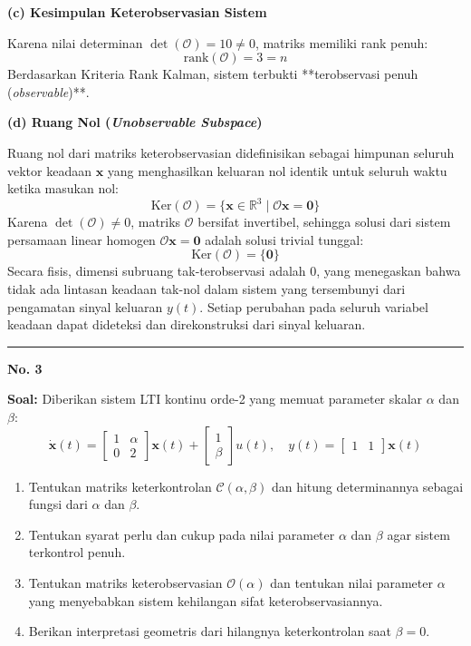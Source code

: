 \documentclass[11pt,a4paper]{article}
\begin{document}
\textbf{(c) Kesimpulan Keterobservasian Sistem}

Karena nilai determinan $\det(\mathcal{O}) = 10 \ne 0$, matriks memiliki rank penuh:
$$\text{rank}(\mathcal{O}) = 3 = n$$
Berdasarkan Kriteria Rank Kalman, sistem terbukti **terobservasi penuh (\textit{observable})**.

\textbf{(d) Ruang Nol (\textit{Unobservable Subspace})}

Ruang nol dari matriks keterobservasian didefinisikan sebagai himpunan seluruh vektor keadaan $\mathbf{x}$ yang menghasilkan keluaran nol identik untuk seluruh waktu ketika masukan nol:
$$\text{Ker}(\mathcal{O}) = \{ \mathbf{x} \in \mathbb{R}^3 \mid \mathcal{O}\mathbf{x} = \mathbf{0} \}$$
Karena $\det(\mathcal{O}) \ne 0$, matriks $\mathcal{O}$ bersifat invertibel, sehingga solusi dari sistem persamaan linear homogen $\mathcal{O}\mathbf{x} = \mathbf{0}$ adalah solusi trivial tunggal:
$$\text{Ker}(\mathcal{O}) = \{ \mathbf{0} \}$$
Secara fisis, dimensi subruang tak-terobservasi adalah 0, yang menegaskan bahwa tidak ada lintasan keadaan tak-nol dalam sistem yang tersembunyi dari pengamatan sinyal keluaran $y(t)$. Setiap perubahan pada seluruh variabel keadaan dapat dideteksi dan direkonstruksi dari sinyal keluaran.

\vspace{12pt}
\hrule
\vspace{10pt}

\textbf{\large No. 3}

\textbf{Soal:}  
Diberikan sistem LTI kontinu orde-2 yang memuat parameter skalar $\alpha$ dan $\beta$:
$$\dot{\mathbf{x}}(t) = \begin{bmatrix} 1 & \alpha \\ 0 & 2 \end{bmatrix} \mathbf{x}(t) + \begin{bmatrix} 1 \\ \beta \end{bmatrix} u(t), \quad y(t) = \begin{bmatrix} 1 & 1 \end{bmatrix} \mathbf{x}(t)$$
\begin{enumerate}[label=(\alph*)]
    \item Tentukan matriks keterkontrolan $\mathcal{C}(\alpha, \beta)$ dan hitung determinannya sebagai fungsi dari $\alpha$ dan $\beta$.
    \item Tentukan syarat perlu dan cukup pada nilai parameter $\alpha$ dan $\beta$ agar sistem terkontrol penuh.
    \item Tentukan matriks keterobservasian $\mathcal{O}(\alpha)$ dan tentukan nilai parameter $\alpha$ yang menyebabkan sistem kehilangan sifat keterobservasiannya.
    \item Berikan interpretasi geometris dari hilangnya keterkontrolan saat $\beta = 0$.
\end{enumerate}
\end{document}
